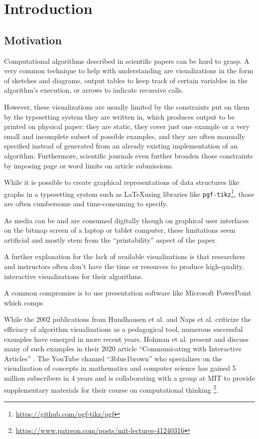 \section{Introduction}

\subsection{Motivation}

Computational algorithms described in scientific papers can be hard to grasp. A very common technique to help with understanding are visualizations in the form of sketches and diagrams, output tables to keep track of certain variables in the algorithm's execution, or arrows to indicate recursive calls.

However, these visualizations are usually limited by the constraints put on them by the typesetting system they are written in, which produces output to be printed on physical paper: they are static, they cover just one example or a very small and incomplete subset of possible examples, and they are often manually specified instead of generated from an already existing implementation of an algorithm. Furthermore, scientific journals even further broaden those constraints by imposing page or word limits on article submissions.

While it is possible to create graphical representations of data structures like graphs in a typesetting system such as \LaTeX  using libraries like \texttt{pgf-tikz}\footnote{\url{https://github.com/pgf-tikz/pgf}}, those are often cumbersome and time-consuming  to specify.


As media can be and are consumed digitally though on graphical user interfaces on the bitmap screen of a laptop or tablet computer, these limitations seem artificial and mostly stem from the ``printability'' aspect of the paper.


A further explanation for the lack of available visualizations is that researchers and instructors often don't have the time or resources to produce high-quality, interactive visualizations for their algorithms.

A common compromise is to use presentation software like Microsoft PowerPoint which comps  

While the 2002 publications from Hundhausen et al. \cite{hundhausen2002meta} and Naps et al. \cite{naps2002exploring} criticize the efficiacy of algorithm visualizations as a pedagogical tool, numerous successful examples have emerged in more recent years.
Hohman et al. present and discuss many of such examples in their 2020 article ``Communicating with Interactive Articles'' \cite{hohman2020communicating}.
The YouTube channel ``3blue1brown'' who specializes on the visualization of concepts in mathematics and computer science has gained 5 million subscribers in 4 years and is collaborating with a group at MIT to provide supplementary materials for their course on computational thinking \footnote{\url{https://www.patreon.com/posts/mit-lectures-41240316}}.


